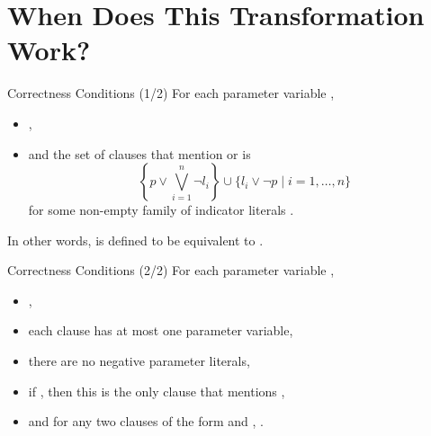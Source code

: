 \documentclass{beamer}
\begin{document}
\section{When Does This Transformation Work?}

\begin{frame}{Correctness Conditions (1/2)}
  For each parameter variable ,
  \begin{itemize}
  \item {},
  \item and the set of clauses that mention  or  is
    \[
      \left\{p \lor \bigvee_{i=1}^n \neg l_i \right\} \cup \{ l_i \lor \neg p
      \mid i = 1, \dots, n \}
    \]
    for some non-empty family of \alert{indicator} literals
    .
  \end{itemize}
  In other words,  is defined to be equivalent to
  .
\end{frame}

\begin{frame}{Correctness Conditions (2/2)}
  For each parameter variable ,
  \begin{itemize}
  \item {},
  \item each clause has at most one parameter variable,
  \item there are no negative parameter literals,
  \item if , then this is the only clause that
    mentions ,
  \item and for any two clauses of the form  and
    , \structure{$\chi \land \psi \equiv \bot$}.
  \end{itemize}
\end{frame}

\end{document}
